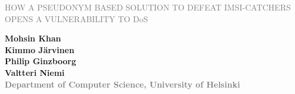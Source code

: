 \documentclass[portrait,a0]{a0poster}
\begin{document}



\begin{multicols}{2} 
\begin{minipage}[t]{1.4\linewidth}
\vspace{-30pt}
\begin{flushleft}
\begin{spacing}{5}
{\Huge{}\textcolor{gray}{\MakeUppercase{How a Pseudonym Based Solution to Defeat IMSI-catchers Opens a Vulnerability to} DoS} \MakeUppercase{}} \\

\end{spacing}
\end{flushleft}
\end{minipage}

\begin{minipage}[t]{.95\linewidth} %
\vspace{-60pt} %
\begin{flushright}
\textsf{\bfseries
Mohsin Khan \\
Kimmo Järvinen\\
Philip Ginzboorg\\
Valtteri Niemi\\
} %
\textcolor{gray}{\textsf{\bfseries{Department of Computer Science, University of Helsinki}}}
\end{flushright}
\end{minipage}
\end{multicols}

\vspace{-60pt}
\noindent\makebox[\linewidth]{\rule{\paperwidth}{5pt}}
\end{document}
